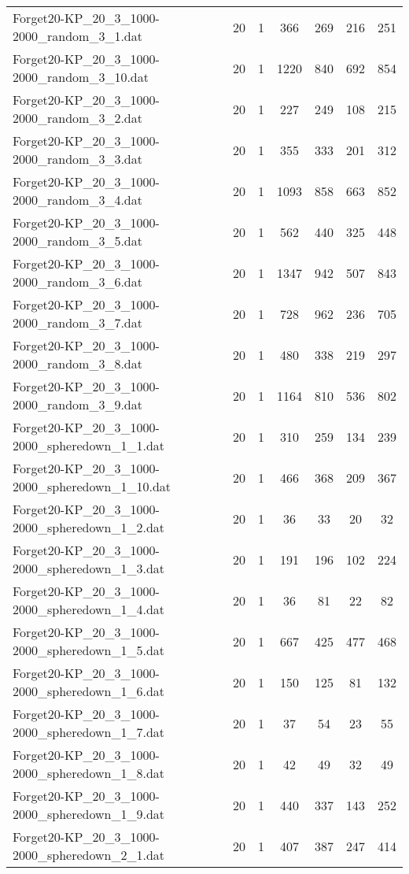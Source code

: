 \begin{table}[!ht]
\begin{tabular}{lcccccc}
Forget20-KP\_20\_3\_1000-2000\_random\_3\_1.dat & 20 & 1 & 366 & 269 & 216 & 251 \\
Forget20-KP\_20\_3\_1000-2000\_random\_3\_10.dat & 20 & 1 & 1220 & 840 & 692 & 854 \\
Forget20-KP\_20\_3\_1000-2000\_random\_3\_2.dat & 20 & 1 & 227 & 249 & 108 & 215 \\
Forget20-KP\_20\_3\_1000-2000\_random\_3\_3.dat & 20 & 1 & 355 & 333 & 201 & 312 \\
Forget20-KP\_20\_3\_1000-2000\_random\_3\_4.dat & 20 & 1 & 1093 & 858 & 663 & 852 \\
Forget20-KP\_20\_3\_1000-2000\_random\_3\_5.dat & 20 & 1 & 562 & 440 & 325 & 448 \\
Forget20-KP\_20\_3\_1000-2000\_random\_3\_6.dat & 20 & 1 & 1347 & 942 & 507 & 843 \\
Forget20-KP\_20\_3\_1000-2000\_random\_3\_7.dat & 20 & 1 & 728 & 962 & 236 & 705 \\
Forget20-KP\_20\_3\_1000-2000\_random\_3\_8.dat & 20 & 1 & 480 & 338 & 219 & 297 \\
Forget20-KP\_20\_3\_1000-2000\_random\_3\_9.dat & 20 & 1 & 1164 & 810 & 536 & 802 \\
Forget20-KP\_20\_3\_1000-2000\_spheredown\_1\_1.dat & 20 & 1 & 310 & 259 & 134 & 239 \\
Forget20-KP\_20\_3\_1000-2000\_spheredown\_1\_10.dat & 20 & 1 & 466 & 368 & 209 & 367 \\
Forget20-KP\_20\_3\_1000-2000\_spheredown\_1\_2.dat & 20 & 1 & 36 & 33 & 20 & 32 \\
Forget20-KP\_20\_3\_1000-2000\_spheredown\_1\_3.dat & 20 & 1 & 191 & 196 & 102 & 224 \\
Forget20-KP\_20\_3\_1000-2000\_spheredown\_1\_4.dat & 20 & 1 & 36 & 81 & 22 & 82 \\
Forget20-KP\_20\_3\_1000-2000\_spheredown\_1\_5.dat & 20 & 1 & 667 & 425 & 477 & 468 \\
Forget20-KP\_20\_3\_1000-2000\_spheredown\_1\_6.dat & 20 & 1 & 150 & 125 & 81 & 132 \\
Forget20-KP\_20\_3\_1000-2000\_spheredown\_1\_7.dat & 20 & 1 & 37 & 54 & 23 & 55 \\
Forget20-KP\_20\_3\_1000-2000\_spheredown\_1\_8.dat & 20 & 1 & 42 & 49 & 32 & 49 \\
Forget20-KP\_20\_3\_1000-2000\_spheredown\_1\_9.dat & 20 & 1 & 440 & 337 & 143 & 252 \\
Forget20-KP\_20\_3\_1000-2000\_spheredown\_2\_1.dat & 20 & 1 & 407 & 387 & 247 & 414 \\

\end{tabular}
\end{table}
